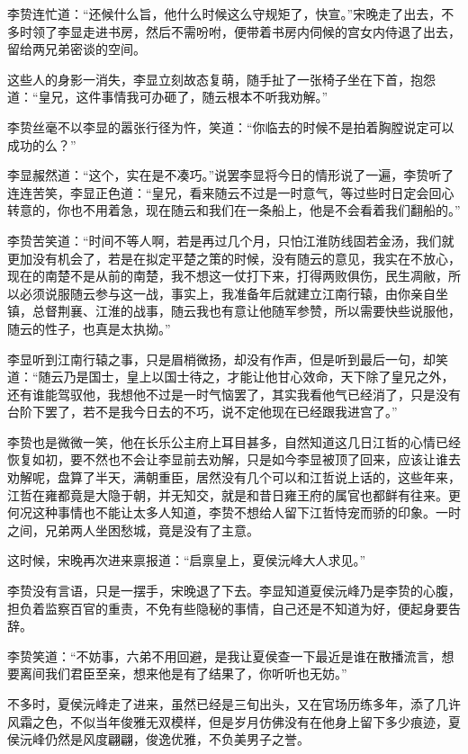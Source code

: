 李贽连忙道：“还候什么旨，他什么时候这么守规矩了，快宣。”宋晚走了出去，不多时领了李显走进书房，然后不需吩咐，便带着书房内伺候的宫女内侍退了出去，留给两兄弟密谈的空间。

这些人的身影一消失，李显立刻故态复萌，随手扯了一张椅子坐在下首，抱怨道：“皇兄，这件事情我可办砸了，随云根本不听我劝解。”

李贽丝毫不以李显的嚣张行径为忤，笑道：“你临去的时候不是拍着胸膛说定可以成功的么？”

李显赧然道：“这个，实在是不凑巧。”说罢李显将今日的情形说了一遍，李贽听了连连苦笑，李显正色道：“皇兄，看来随云不过是一时意气，等过些时日定会回心转意的，你也不用着急，现在随云和我们在一条船上，他是不会看着我们翻船的。”

李贽苦笑道：“时间不等人啊，若是再过几个月，只怕江淮防线固若金汤，我们就更加没有机会了，若是在拟定平楚之策的时候，没有随云的意见，我实在不放心，现在的南楚不是从前的南楚，我不想这一仗打下来，打得两败俱伤，民生凋敝，所以必须说服随云参与这一战，事实上，我准备年后就建立江南行辕，由你亲自坐镇，总督荆襄、江淮的战事，随云我也有意让他随军参赞，所以需要快些说服他，随云的性子，也真是太执拗。”

李显听到江南行辕之事，只是眉梢微扬，却没有作声，但是听到最后一句，却笑道：“随云乃是国士，皇上以国士待之，才能让他甘心效命，天下除了皇兄之外，还有谁能驾驭他，我想他不过是一时气恼罢了，其实我看他气已经消了，只是没有台阶下罢了，若不是我今日去的不巧，说不定他现在已经跟我进宫了。”

李贽也是微微一笑，他在长乐公主府上耳目甚多，自然知道这几日江哲的心情已经恢复如初，要不然也不会让李显前去劝解，只是如今李显被顶了回来，应该让谁去劝解呢，盘算了半天，满朝重臣，居然没有几个可以和江哲说上话的，这些年来，江哲在雍都竟是大隐于朝，并无知交，就是和昔日雍王府的属官也都鲜有往来。更何况这种事情也不能让太多人知道，李贽不想给人留下江哲恃宠而骄的印象。一时之间，兄弟两人坐困愁城，竟是没有了主意。

这时候，宋晚再次进来禀报道：“启禀皇上，夏侯沅峰大人求见。”

李贽没有言语，只是一摆手，宋晚退了下去。李显知道夏侯沅峰乃是李贽的心腹，担负着监察百官的重责，不免有些隐秘的事情，自己还是不知道为好，便起身要告辞。

李贽笑道：“不妨事，六弟不用回避，是我让夏侯查一下最近是谁在散播流言，想要离间我们君臣至亲，想来他是有了结果了，你听听也无妨。”

不多时，夏侯沅峰走了进来，虽然已经是三旬出头，又在官场历练多年，添了几许风霜之色，不似当年俊雅无双模样，但是岁月仿佛没有在他身上留下多少痕迹，夏侯沅峰仍然是风度翩翩，俊逸优雅，不负美男子之誉。

